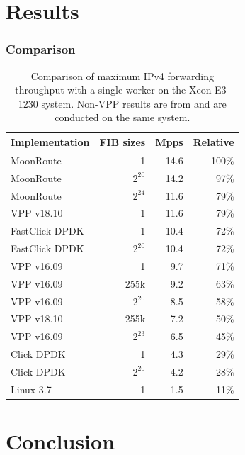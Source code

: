 \section{Results}


\begin{frame}
    \frametitle{Comparison}
    \begin{table}
        \begin{tabular}[]{ l r r r }
            Implementation   & FIB sizes & Mpps     & Relative \\ 
            \midrule
            MoonRoute        & 1         & 14.6     & 100\% \\
            MoonRoute        & $2^{20}$  & 14.2     & 97\% \\
            MoonRoute        & $2^{24}$  & 11.6     & 79\% \\
            VPP v18.10       & 1         & 11.6     & 79\% \\
            FastClick DPDK   & 1         & 10.4     & 72\% \\
            FastClick DPDK   & $2^{20}$  & 10.4     & 72\% \\
            VPP v16.09       & 1         & 9.7      & 71\% \\
            VPP v16.09       & 255k      & 9.2      & 63\% \\
            VPP v16.09       & $2^{20}$  & 8.5      & 58\% \\
            VPP v18.10       & 255k      & 7.2      & 50\% \\
            VPP v16.09       & $2^{23}$  & 6.5      & 45\% \\
            Click DPDK       & 1         & 4.3      & 29\% \\
            Click DPDK       & $2^{20}$  & 4.2      & 28\% \\
            Linux 3.7        & 1         & 1.5      & 11\% \\

            \midrule
        \end{tabular}
        \caption{Comparison of maximum IPv4 forwarding throughput with a single worker on the Xeon E3-1230 system. Non-VPP results are from \cite{chair:architecture} and are conducted on the same system. }
        \label{table:comparison}
    \end{table}
\end{frame}

\section{Conclusion}

